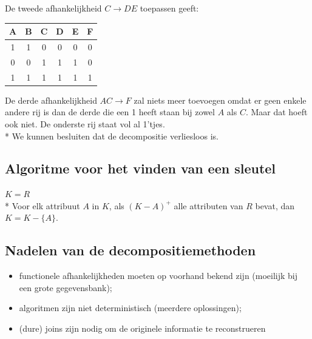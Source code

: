 \documentclass[10pt]{article}
\begin{document}
De tweede afhankelijkheid $C \rightarrow DE$ toepassen geeft:
\begin{center}
\begin{tabular}{| c | c | c | c | c | c |} \hline
  A & B & C & D & E & F\\ \hline
  1 & 1 & 0 & 0 & 0 & 0\\ \hline
  0 & 0 & 1 & 1 & 1 & 0\\ \hline
  1 & 1 & 1 & 1 & 1 & 1\\ \hline
\end{tabular}
\end{center}
De derde afhankelijkheid $AC \rightarrow F$ zal niets meer toevoegen omdat er geen enkele andere rij is dan de derde die een 1 heeft staan bij zowel $A$ als $C$. Maar dat hoeft ook niet. De onderste rij staat vol al 1'tjes.\\*
We kunnen besluiten dat de decompositie verliesloos is.
\subsection{Algoritme voor het vinden van een sleutel}
$K = R$\\*
Voor elk attribuut $A$ in $K$, als $(K - A)^+$ alle attributen van $R$ bevat, dan $K = K - \{A\}$.
\subsection{Nadelen van de decompositiemethoden}
\begin{itemize}
\item functionele afhankelijkheden moeten op voorhand bekend zijn (moeilijk bij een grote gegevensbank);
\item algoritmen zijn niet deterministisch (meerdere oplossingen);
\item (dure) joins zijn nodig om de originele informatie te reconstrueren
\end{itemize}
\end{document}
